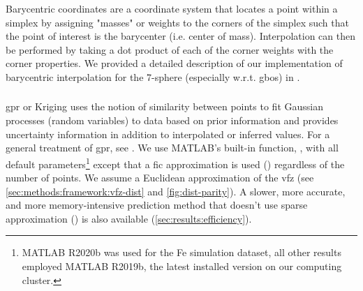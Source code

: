 \documentclass[final,twocolumn,12pt]{elsarticle}
\begin{document}
Barycentric coordinates are a coordinate system that locates a point within a simplex by assigning "masses" or weights to the corners of the simplex such that the point of interest is the barycenter (i.e. center of mass). Interpolation can then be performed by taking a dot product of each of the corner weights with the corner properties. We provided a detailed description of our implementation of barycentric interpolation for the 7-sphere (especially w.r.t. \glspl{gbo}) in \citet{bairdBarycentricInterpolation7SphereUnderReview}.

\subsubsection{}
\label{sec:methods:interp:gpr}

\Gls{gpr} or Kriging uses the notion of similarity between points to fit Gaussian processes (random variables) to data based on prior information and provides uncertainty information in addition to interpolated or inferred values. For a general treatment of \gls{gpr}, see \citet{rasmussenGaussianProcessesMachine2006}. We use MATLAB's built-in function, , with all default parameters\footnote{MATLAB R2020b was used for the Fe simulation dataset, all other results employed MATLAB R2019b, the latest installed version on our computing cluster.} except that a \gls{fic} approximation is used () regardless of the number of \inpt{} points. We assume a Euclidean approximation of the \gls{vfz} (see \cref{sec:methods:framework:vfz-dist} and \cref{fig:dist-parity}). A slower, more accurate, and more memory-intensive prediction method that doesn't use sparse approximation () is also available (\cref{sec:results:efficiency}). %
\end{document}
